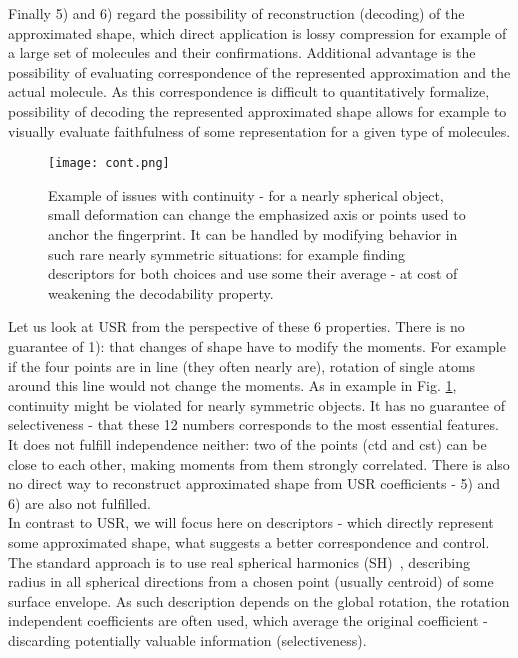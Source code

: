 \documentclass[10pt,journal]{IEEEtranTCOM}
\theoremstyle{plain}
\begin{document}
Finally 5) and 6) regard the possibility of reconstruction (decoding) of the approximated shape, which direct application is lossy compression for example of a large set of molecules and their confirmations. Additional advantage is the possibility of evaluating correspondence of the represented approximation and the actual molecule. As this correspondence is difficult to quantitatively formalize, possibility of decoding the represented approximated shape allows for example to visually evaluate faithfulness of some representation for a given type of molecules.

\begin{figure}[t!]
    \centering
        \texttt{[image: cont.png]}
        \caption{Example of issues with continuity - for a nearly spherical object, small deformation can change the emphasized axis or points used to anchor the fingerprint. It can be handled by modifying behavior in such rare nearly symmetric situations: for example finding descriptors for both choices and use some their average - at cost of weakening the decodability property. }
        \label{cont}
\end{figure}

Let us look at USR from the perspective of these 6 properties. There is no guarantee of 1): that changes of shape have to modify the moments. For example if the four points are in line (they often nearly are), rotation of single atoms around this line would not change the moments. As in example in Fig. \ref{cont}, continuity might be violated for nearly symmetric objects. It has no guarantee of selectiveness - that these 12 numbers corresponds to the most essential features. It does not fulfill independence neither: two of the points (ctd and cst) can be close to each other, making moments from them strongly correlated. There is also no direct way to reconstruct approximated shape from USR coefficients - 5) and 6) are also not fulfilled.\\

In contrast to USR, we will focus here on descriptors - which directly represent some approximated shape, what suggests a better correspondence and control. The standard approach is to use real spherical harmonics (SH)~\cite{harm}, describing radius in all spherical directions from a chosen point (usually centroid) of some surface envelope. As such description depends on the global rotation, the rotation independent coefficients are often used, which average the original coefficient - discarding potentially valuable information (selectiveness).
\end{document}
